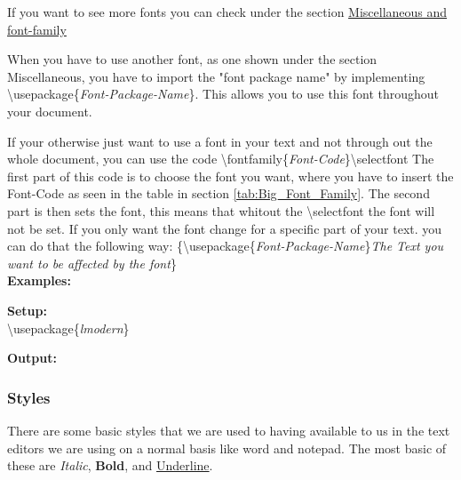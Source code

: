 \documentclass{article}
\newcommand{\jbs}[1]{\textbackslash{}#1} %
\begin{document}
If you want to see more fonts you can check under the section  \hyperref[secc:font-family-sheet]{Miscellaneous and font-family}

When you have to use another font, as one shown under the section Miscellaneous, you have to import the "font package name" by implementing \jbs{usepackage\{\textit{Font-Package-Name}\}}.
This allows you to use this font throughout your document.

If your otherwise just want to use a font in your text and not through out the whole document, you can use the code \jbs{fontfamily\{\textit{Font-Code}\}}\jbs{selectfont}
The first part of this code is to choose the font you want, where you have to insert the Font-Code as seen in the table in section \ref{tab:Big_Font_Family}.
The second part is then sets the font, this means that whitout the \jbs{selectfont} the font will not be set. If you only want the font change for a specific part
of your text. you can do that the following way: \{\jbs{usepackage\{\textit{Font-Package-Name}\}}\textit{The Text you want to be affected by the font}\} \\

{\large\textbf{Examples:}}
\begin{multicols}{2}
    \noindent
    \vspace{0.5em}
    \textbf{Setup:} \\
    \jbs{usepackage}\{\textit{lmodern}\}
    \vspace{1em}

    \noindent
    \vspace{0.5em}
    \textbf{Output:} \\
    \vspace{1em}

\end{multicols}

\subsubsection{Styles}\label{subsubsec:text_styles}
There are some basic styles that we are used to having available to us in the text editors we are using on a normal basis like word and notepad.
The most basic of these are \textit{Italic}, \textbf{Bold}, and \underline{Underline}. 
\end{document}
